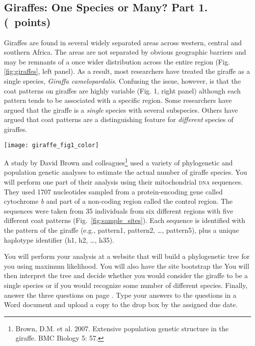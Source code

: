 \documentclass[11pt, addpoints]{exam}
\begin{document}
\subsection*{Giraffes: One Species or Many? Part 1. (\numpoints\ points)}

Giraffes are found in several widely separated areas across western,
central and southern Africa. The areas are not separated by obvious
geographic barriers and may be remnants of a once wider distribution
across the entire region (Fig. \ref{fig:giraffes}, left panel). As a result, most
researchers have treated the giraffe as a single species, \textit{Giraffa
camelopardalis}. Confusing the issue, however, is that the coat patterns
on giraffes are highly variable (Fig. 1, right panel) although each
pattern tends to be associated with a specific region. Some researchers
have argued that the giraffe is a \emph{single} species with several
subspecies. Others have argued that coat patterns are a distinguishing
feature for \emph{different} species of giraffes.

\begin{center}
	\texttt{[image: giraffe\_fig1\_color]}
\end{center}

A study by David Brown and colleagues\footnote{Brown, D.M. et al. 2007.
  Extensive population genetic structure in the giraffe. BMC Biology 5:
  57.} used a variety of phylogenetic and population genetic analyses to
estimate the actual number of giraffe species. You will perform one part
of their analysis using their mitochondrial \textsc{dna} sequences. They used
1707 nucleotides sampled from a protein-encoding gene called cytochrome
\textit{b} and part of a non-coding region called the control region. The
sequences were taken from 35 individuals from six different regions with
five different coat patterns (Fig.~\ref{fig:sample_sites}). Each sequence is identified with
the pattern of the giraffe (e.g., pattern1, pattern2, \ldots{},
pattern5), plus a unique haplotype identifier (h1, h2, \ldots{}, h35).

You will perform your analysis at a website that will build a phylogenetic tree for you using
maximum likelihood. You will also have the site bootstrap the  You will then interpret
the tree and decide whether you would consider the giraffe to be a
single species or if you would recognize some number of different
species. Finally, answer the three questions on page \pageref{sec:questions}. Type your
answers to the questions in a Word document and upload a copy to the drop box by the assigned due date.
\end{document}
